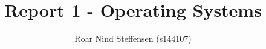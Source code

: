 \documentclass[sigconf]{acmart}
\begin{document}
\title{Report 1 - Operating Systems}
\subtitle{Roar Nind Steffensen (s144107)}





\maketitle







 
\end{document}
